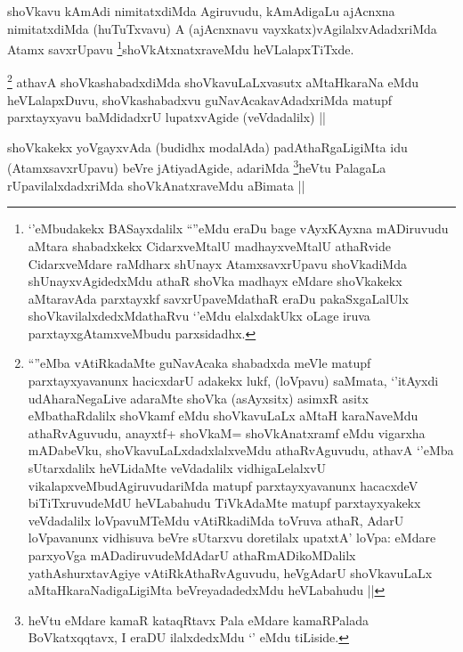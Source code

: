 
\begin{artha}
shoVkavu kAmAdi nimitatxdiMda Agiruvudu, kAmAdigaLu ajAcnxna nimitatxdiMda (huTuTxvavu) A (ajAcnxnavu vayxkatx)vAgilalxvAdadxriMda Atamx savxrUpavu \footnote{`\stext'eMbudakekx BASayxdalilx ``\stext''eMdu eraDu bage vAyxKAyxna mADiruvudu aMtara shabadxkekx CidarxveMtalU madhayxveMtalU athaRvide CidarxveMdare raMdharx shUnayx AtamxsavxrUpavu shoVkadiMda shUnayxvAgidedxMdu athaR shoVka madhayx eMdare shoVkakekx aMtaravAda parxtayxkf savxrUpaveMdathaR eraDu pakaSxgaLalUlx shoVkavilalxdedxMdathaRvu `\stext'eMdu elalxdakUkx oLage iruva parxtayxgAtamxveMbudu parxsidadhx.}shoVkAtxnatxraveMdu heVLalapxTiTxde.
\end{artha}


\begin{artha}
\footnote{``\stext''eMba vAtiRkadaMte guNavAcaka shabadxda meVle matupf parxtayxyavanunx hacicxdarU adakekx lukf, (loVpavu) saMmata, `\stext'itAyxdi udAharaNegaLive adaraMte shoVka (asAyxsitx) asimxR asitx eMbathaRdalilx shoVkamf eMdu shoVkavuLaLx aMtaH karaNaveMdu athaRvAguvudu, anayxtf+ shoVkaM= shoVkAnatxramf eMdu vigarxha mADabeVku, shoVkavuLaLxdadxlalxveMdu athaRvAguvudu, athavA `\stext'eMba sUtarxdalilx heVLidaMte veVdadalilx vidhigaLelalxvU vikalapxveMbudAgiruvudariMda matupf parxtayxyavanunx hacacxdeV biTiTxruvudeMdU heVLabahudu TiVkAdaMte matupf parxtayxyakekx veVdadalilx loVpavuMTeMdu vAtiRkadiMda toVruva athaR, AdarU loVpavanunx vidhisuva beVre sUtarxvu doretilalx upatxtA' loVpa: eMdare parxyoVga mADadiruvudeMdAdarU athaRmADikoMDalilx yathAshurxtavAgiye vAtiRkAthaRvAguvudu, heVgAdarU shoVkavuLaLx aMtaHkaraNadigaLigiMta beVreyadadedxMdu heVLabahudu ||}
athavA shoVkashabadxdiMda shoVkavuLaLxvasutx aMtaHkaraNa eMdu heVLalapxDuvu, shoVkashabadxvu guNavAcakavAdadxriMda matupf parxtayxyavu baMdidadxrU lupatxvAgide (veVdadalilx) ||  
\end{artha}


\begin{artha}
shoVkakekx yoVgayxvAda (budidhx modalAda) padAthaRgaLigiMta idu (AtamxsavxrUpavu) beVre jAtiyadAgide, adariMda \footnote{heVtu eMdare kamaR kataqRtavx Pala eMdare kamaRPalada BoVkatxqqtavx, I eraDU ilalxdedxMdu `\stext' eMdu tiLiside.}heVtu PalagaLa rUpavilalxdadxriMda shoVkAnatxraveMdu aBimata ||
\end{artha}

